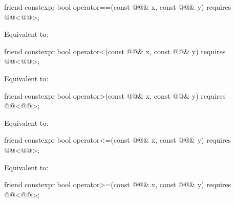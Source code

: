 %
\begin{itemdecl}
friend constexpr bool operator==(const @@& x, const @@& y)
  requires @@<@@>;
\end{itemdecl}

\begin{itemdescr}
\pnum
\effects
Equivalent to: 
\end{itemdescr}

%
\begin{itemdecl}
friend constexpr bool operator<(const @@& x, const @@& y)
  requires @@<@@>;
\end{itemdecl}

\begin{itemdescr}
\pnum
\effects
Equivalent to: 
\end{itemdescr}

%
\begin{itemdecl}
friend constexpr bool operator>(const @@& x, const @@& y)
  requires @@<@@>;
\end{itemdecl}

\begin{itemdescr}
\pnum
\effects
Equivalent to: 
\end{itemdescr}

%
\begin{itemdecl}
friend constexpr bool operator<=(const @@& x, const @@& y)
  requires @@<@@>;
\end{itemdecl}

\begin{itemdescr}
\pnum
\effects
Equivalent to: 
\end{itemdescr}

%
\begin{itemdecl}
friend constexpr bool operator>=(const @@& x, const @@& y)
  requires @@<@@>;
\end{itemdecl}

